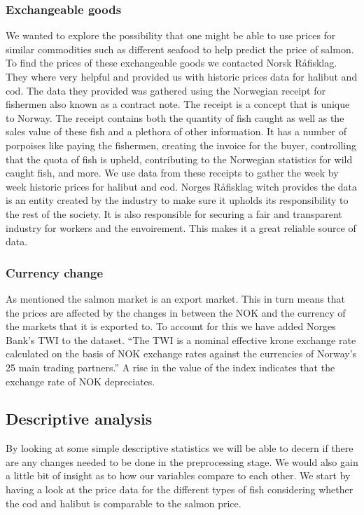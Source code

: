 \subsubsection{Exchangeable goods}\label{Exchangeable goods}
We wanted to explore the possibility that one might be able to use prices for similar commodities such as different seafood to help predict the price of salmon. To find the prices of these exchangeable goods we contacted Norsk Råfisklag. They where very helpful and provided us with historic prices data for halibut and cod. The data they provided was gathered using the Norwegian receipt for fishermen also known as a contract note. The receipt is a concept that is unique to Norway. The receipt contains both the quantity of fish caught as well as the sales value of these fish and a plethora of other information. It has a number of porpoises like paying the fishermen, creating the invoice for the buyer, controlling that the quota of fish is upheld, contributing to the Norwegian statistics for wild caught fish, and more. We use data from these receipts to gather the week by week historic prices for halibut and cod. Norges Råfisklag witch provides the data is an entity created by the industry to make sure it upholds its responsibility to the rest of the society. It is also responsible for securing a fair and transparent industry for workers and the envoirement. This makes it a great reliable source of data.\parencite{Harland_2022}

\subsubsection{Currency change}\label{Currency change}
As mentioned the salmon market is an export market. This in turn means that the prices are affected by the changes in between the NOK and the currency of the markets that it is exported to. To account for this we have added Norges Bank's TWI to the dataset. ``The TWI is a nominal effective krone exchange rate calculated on the basis of NOK exchange rates against the currencies of Norway's 25 main trading partners.'' \parencite{norges_bank_2020} A rise in the value of the index indicates that the exchange rate of NOK depreciates.

\subsection{Descriptive analysis}
By looking at some simple descriptive statistics we will be able to decern if there are any changes needed to be done in the preprocessing stage. We would also gain a little bit of insight as to how our variables compare to each other. We start by having a look at the price data for the different types of fish considering whether the cod and halibut is comparable to the salmon price.

